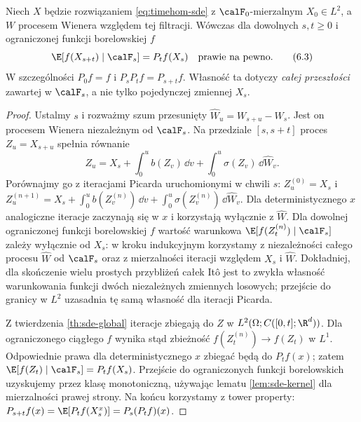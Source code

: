 \begin{twierdzenie}
\label{th:sde-markov}
Niech $X$ będzie rozwiązaniem \eqref{eq:timehom-sde}
z $\calF_0$-mierzalnym $X_0\in L^2$, a $W$ procesem
Wienera względem tej filtracji. Wówczas dla dowolnych
$s,t\ge0$ i ograniczonej funkcji borelowskiej $f$
\[
\E[f(X_{s+t})\mid\calF_s]=P_tf(X_s)
\quad\text{prawie na pewno}.
\tag{6.3}\label{eq:sde-markov}
\]
W szczególności $P_0f=f$ i $P_sP_tf=P_{s+t}f$.
Własność ta dotyczy \emph{całej przeszłości} zawartej
w $\calF_s$, a nie tylko pojedynczej zmiennej $X_s$.
\end{twierdzenie}
\begin{proof}
Ustalmy $s$ i rozważmy szum przesunięty
$\widehat W_u=W_{s+u}-W_s$. Jest on procesem Wienera
niezależnym od $\calF_s$. Na przedziale $[s,s+t]$
proces $Z_u=X_{s+u}$ spełnia równanie
\[
Z_u=X_s+\int_0^u b(Z_v)\,\dd v
+\int_0^u\sigma(Z_v)\,\dd\widehat W_v.
\]
Porównajmy go z iteracjami Picarda uruchomionymi
w chwili $s$: $Z^{(0)}_u=X_s$ i
$Z^{(n+1)}_u=X_s+\int_0^u b(Z_v^{(n)})\,\dd v
+\int_0^u\sigma(Z_v^{(n)})\,\dd\widehat W_v$.
Dla deterministycznego $x$ analogiczne iteracje
zaczynają się w $x$ i korzystają wyłącznie z
$\widehat W$. Dla dowolnej ograniczonej funkcji
borelowskiej $f$ wartość warunkowa
$\E[f(Z_t^{(n)})\mid\calF_s]$ zależy wyłącznie od
$X_s$: w kroku indukcyjnym korzystamy z niezależności
całego procesu $\widehat W$ od $\calF_s$ oraz z
mierzalności iteracji względem $X_s$ i $\widehat W$.
Dokładniej, dla skończenie wielu prostych przybliżeń
całek Itô jest to zwykła własność warunkowania
funkcji dwóch niezależnych zmiennych losowych;
przejście do granicy w $L^2$ uzasadnia tę samą
własność dla iteracji Picarda.

Z twierdzenia \ref{th:sde-global} iteracje zbiegają do
$Z$ w $L^2(\Omega;C([0,t];\R^d))$.
Dla ograniczonego ciągłego $f$ wynika stąd
zbieżność $f(Z_t^{(n)})\to f(Z_t)$ w $L^1$.
Odpowiednie prawa dla deterministycznego $x$
zbiegać będą do $P_tf(x)$; zatem
$\E[f(Z_t)\mid\calF_s]=P_tf(X_s)$.
Przejście do ograniczonych funkcji borelowskich
uzyskujemy przez klasę monotoniczną, używając
lematu \ref{lem:sde-kernel} dla mierzalności
prawej strony. Na końcu korzystamy z tower property:
$P_{s+t}f(x)=\E[P_tf(X_s^x)]=P_s(P_tf)(x)$.
\end{proof}

